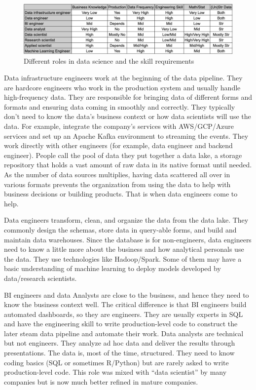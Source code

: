 \documentclass[
  12pt,
]{krantz}
\begin{document}
\begin{figure}
\centering
\includegraphics{../course2020/slides/01Introduction/images/dsrole.png}
\caption{Different roles in data science and the skill requirements}
\end{figure}

Data infrastructure engineers work at the beginning of the data pipeline. They are hardcore engineers who work in the production system and usually handle high-frequency data. They are responsible for bringing data of different forms and formats and ensuring data coming in smoothly and correctly. They typically don't need to know the data's business context or how data scientists will use the data. For example, integrate the company's services with AWS/GCP/Azure services and set up an Apache Kafka environment to streaming the events. They work directly with other engineers (for example, data engineer and backend engineer). People call the pool of data they put together a data lake, a storage repository that holds a vast amount of raw data in its native format until needed. As the number of data sources multiplies, having data scattered all over in various formats prevents the organization from using the data to help with business decisions or building products. That is when data engineers come to help.

Data engineers transform, clean, and organize the data from the data lake. They commonly design the schemas, store data in query-able forms, and build and maintain data warehouses. Since the database is for non-engineers, data engineers need to know a little more about the business and how analytical personals use the data. They use technologies like Hadoop/Spark. Some of them may have a basic understanding of machine learning to deploy models developed by data/research scientists.

BI engineers and data Analysts are close to the business, and hence they need to know the business context well. The critical difference is that BI engineers build automated dashboards, so they are engineers. They are usually experts in SQL and have the engineering skill to write production-level code to construct the later steam data pipeline and automate their work. Data analysts are technical but not engineers. They analyze ad hoc data and deliver the results through presentations. The data is, most of the time, structured. They need to know coding basics (SQL or sometimes R/Python) but are rarely asked to write production-level code. This role was mixed with ``data scientist'' by many companies but is now much better refined in mature companies.
\end{document}
